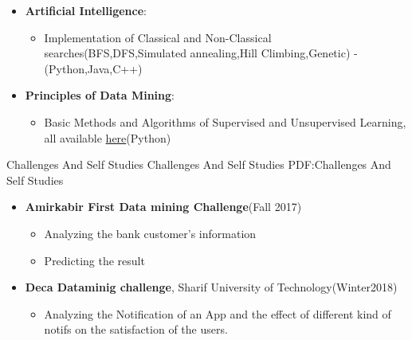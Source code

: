 \documentclass[letterpaper,MMMyyyy,nonstopmode]{simpleresumecv}
\begin{document}
\begin{Body}
\begin{itemize}
   
       	  \item \textbf{Artificial Intelligence}: 
	    \begin{itemize}
        \item 
		  Implementation of Classical and Non-Classical searches(BFS,DFS,Simulated annealing,Hill Climbing,Genetic) - (Python,Java,C++)
     \end{itemize}
     
     
       	  \item \textbf{Principles of Data Mining}: 
	    \begin{itemize}
        \item 
	Basic Methods and Algorithms of Supervised and Unsupervised Learning, all available \href{https://github.com/Yasaman1997/DataMining_and_DataAnalysis/tree/master/DM_2018/HWS}{here}(Python)
     \end{itemize}
     
     

  
  
  
     
  \end{itemize}	
 	



\Section
{Challenges And Self Studies}
{Challenges And Self Studies}
{PDF:Challenges And Self Studies}

\Entry
\begin{itemize}

\item \textbf {Amirkabir First Data mining Challenge}(Fall 2017)
    	
   \begin{itemize}
	   
     \item Analyzing the bank customer's  information
     \item Predicting the result
   
    \end{itemize}
	
		

\item \textbf {Deca Dataminig challenge}, Sharif University of Technology(Winter2018)
 \begin{itemize}
	   
     \item Analyzing the Notification of an App and the effect of different kind of notifs on the satisfaction of the users.
    

\end{itemize}
\end{itemize}
\end{Body}
\end{document}
